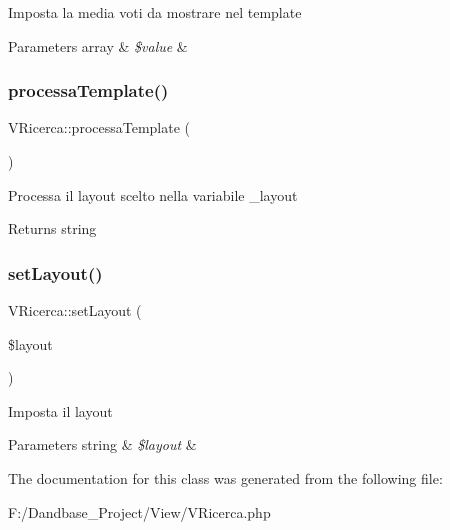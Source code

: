 Imposta la media voti da mostrare nel template


\begin{DoxyParams}[1]{Parameters}
array & {\em \$value} & \\
\hline
\end{DoxyParams}
\mbox{\label{class_v_ricerca_accab76d9a06a79072c80b4014fd9f66b}} 
\subsubsection{\texorpdfstring{processa\+Template()}{processaTemplate()}}
{\footnotesize\ttfamily V\+Ricerca\+::processa\+Template (\begin{DoxyParamCaption}{ }\end{DoxyParamCaption})}

Processa il layout scelto nella variabile \+\_\+layout

\begin{DoxyReturn}{Returns}
string 
\end{DoxyReturn}
\mbox{\label{class_v_ricerca_ac5f6a699be0236cd12a8954b309803c0}} 
\subsubsection{\texorpdfstring{set\+Layout()}{setLayout()}}
{\footnotesize\ttfamily V\+Ricerca\+::set\+Layout (\begin{DoxyParamCaption}\item[{}]{\$layout }\end{DoxyParamCaption})}

Imposta il layout


\begin{DoxyParams}[1]{Parameters}
string & {\em \$layout} & \\
\hline
\end{DoxyParams}


The documentation for this class was generated from the following file\+:\begin{DoxyCompactItemize}
\item 
F\+:/\+Dandbase\+\_\+\+Project/\+View/V\+Ricerca.\+php\end{DoxyCompactItemize}

